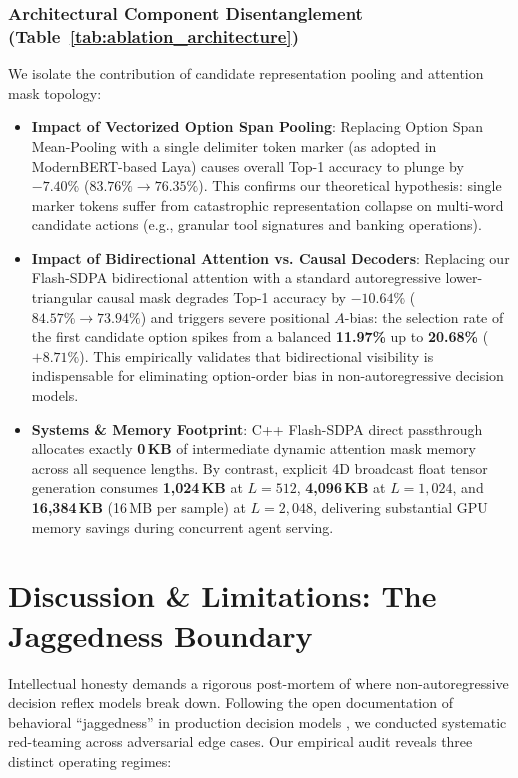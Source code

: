 \documentclass[11pt,a4paper]{article}
\begin{document}
\subsubsection{Architectural Component Disentanglement (Table~\ref{tab:ablation_architecture})}
We isolate the contribution of candidate representation pooling and attention mask topology:
\begin{itemize}
    \item \textbf{Impact of Vectorized Option Span Pooling}: Replacing Option Span Mean-Pooling with a single delimiter token marker (as adopted in ModernBERT-based Laya) causes overall Top-1 accuracy to plunge by \textbf{$-7.40\%$} ($83.76\% \to 76.35\%$). This confirms our theoretical hypothesis: single marker tokens suffer from catastrophic representation collapse on multi-word candidate actions (e.g., granular tool signatures and banking operations).
    \item \textbf{Impact of Bidirectional Attention vs. Causal Decoders}: Replacing our Flash-SDPA bidirectional attention with a standard autoregressive lower-triangular causal mask degrades Top-1 accuracy by \textbf{$-10.64\%$} ($84.57\% \to 73.94\%$) and triggers severe positional $A$-bias: the selection rate of the first candidate option spikes from a balanced \textbf{11.97\%} up to \textbf{20.68\%} ($+8.71\%$). This empirically validates that bidirectional visibility is indispensable for eliminating option-order bias in non-autoregressive decision models.
    \item \textbf{Systems \& Memory Footprint}: C++ Flash-SDPA direct passthrough allocates exactly \textbf{0\,KB} of intermediate dynamic attention mask memory across all sequence lengths. By contrast, explicit 4D broadcast float tensor generation consumes \textbf{1,024\,KB} at $L=512$, \textbf{4,096\,KB} at $L=1,024$, and \textbf{16,384\,KB} (16\,MB per sample) at $L=2,048$, delivering substantial GPU memory savings during concurrent agent serving.
\end{itemize}

\section{Discussion \& Limitations: The Jaggedness Boundary}

Intellectual honesty demands a rigorous post-mortem of where non-autoregressive decision reflex models break down. Following the open documentation of behavioral ``jaggedness'' in production decision models \cite{alphamatch2025jev}, we conducted systematic red-teaming across adversarial edge cases. Our empirical audit reveals three distinct operating regimes:
\end{document}
